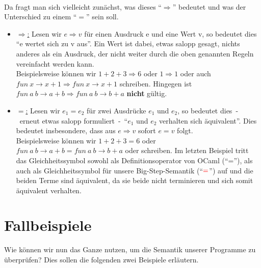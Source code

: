 \documentclass[hidelinks]{article}
\theoremstyle{plain}
\theoremstyle{definition}
\theoremstyle{rem}
\begin{document}
\begin{sloppypar}
\\Da fragt man sich vielleicht zunächst, was dieses ``$\Rightarrow$'' bedeutet und was der Unterschied zu einem ``$=$'' sein soll.
\begin{itemize}
\item \underline{$\Rightarrow$:} Lesen wir $e\Rightarrow v$ für einen Ausdruck e und eine Wert v, so bedeutet dies ``e wertet sich zu v aus''. Ein Wert ist dabei, etwas salopp gesagt, nichts anderes als ein Ausdruck, der nicht weiter durch die oben genannten Regeln vereinfacht werden kann.\\
Beispielsweise können wir $1+2+3\Rightarrow 6$ oder $1\Rightarrow 1$ oder auch $fun\ x \rightarrow x+1\Rightarrow fun\ x \rightarrow x+1$ schreiben. Hingegen ist $fun\ a\ b\rightarrow a+b\Rightarrow fun\ a\ b\rightarrow b+a$ \textbf{nicht} gültig.
\item \underline{$=$:} Lesen wir $e_1=e_2$ für zwei Ausdrücke $e_1$ und $e_2$, so bedeutet dies~-~erneut etwas salopp formuliert~-~``$e_1$ und $e_2$ verhalten sich äquivalent''. Dies bedeutet insbesondere, dass aus $e \Rightarrow v$ sofort $e=v$ folgt.\\
Beispielsweise können wir $1+2+3=6$ oder $fun\ a\ b\rightarrow a+b=fun\ a\ b\rightarrow b+a$ oder  schreiben. Im letzten Beispiel tritt das Gleichheitssymbol sowohl als Definitionsoperator von OCaml (``=''), als auch als Gleichheitssymbol für unsere Big-Step-Semantik (``$\mathbin{\textcolor{red}{=}}$'') auf und die beiden Terme sind äquivalent, da sie beide nicht terminieren und sich somit äquivalent verhalten.
\end{itemize}
\section{Fallbeispiele}
Wie können wir nun das Ganze nutzen, um die Semantik unserer Programme zu überprüfen? Dies sollen die folgenden zwei Beispiele erläutern.

\end{sloppypar}
\end{document}

